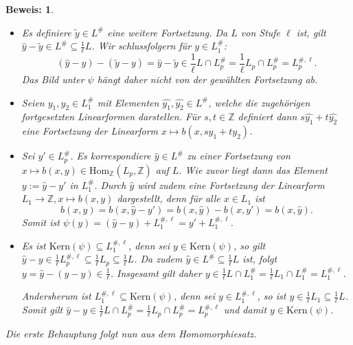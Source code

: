 \documentclass[12pt,a4paper,halfparskip,headsepline,bibtotocnumbered]{scrreprt}
\theoremstyle{nummermitklammern}
\theoremstyle{nonumberbreak}
\newtheorem{beweis}{Beweis:}
\newcommand{\Z}{\mathbb{Z}}
\newcommand{\Kern}{\text{Kern}}
\begin{document}
\begin{beweis}
	\begin{itemize}[align=left, leftmargin = *]
		\item[Wohldefiniert:] Es definiere $\tilde{y} \in L^\#$ eine weitere Fortsetzung. Da $L$ von Stufe $\ell$ ist, gilt $\hat{y} - \tilde{y} \in L^\# \subseteq \frac{1}{\ell} L$. Wir schlussfolgern für $y \in L_1^\#$:
			\begin{equation*}
				(\hat{y} - y) - (\tilde{y} - y) = \hat{y} - \tilde{y} \in \frac{1}{\ell} L \cap L_p^\# = \frac{1}{\ell} L_p \cap L_p^\# = L_p^{\#,\ell}.
			\end{equation*}
			Das Bild unter $\psi$ hängt daher nicht von der gewählten Fortsetzung ab.
		\item[Linearität:] Seien $y_1, y_2 \in L_1^\#$ mit Elementen $\hat{y_1}, \hat{y_2} \in L^\#$, welche die zugehörigen fortgesetzten Linearformen darstellen. Für $s,t \in \Z$ definiert dann $s \hat{y_1} + t \hat{y_2}$ eine Fortsetzung der Linearform $x \mapsto b(x, s y_1 + t y_2)$.
		\item[Surjektivität:] Sei $y' \in L_p^\#$. Es korrespondiere $\hat{y} \in L^\#$ zu einer Fortsetzung von\linebreak
		$x \mapsto b(x,y) \in \text{Hom}_\Z(L_p, \Z)$ auf $L$. Wie zuvor liegt dann das Element $y := \hat{y} - y'$ in $L_1^\#$. Durch $\hat{y}$ wird zudem eine Fortsetzung der Linearform $L_1 \rightarrow \Z, x \mapsto b(x,y)$ dargestellt, denn für alle $x \in L_1$ ist
			\begin{equation*}
				b(x,y) = b(x, \hat{y} - y') = b(x, \hat{y}) - b(x, y') = b(x, \hat{y}).
			\end{equation*}
			Somit ist $\psi(y) = (\hat{y} - y) + L_1^{\#, \ell} = y' + L_1^{\#, \ell}$.
		\item[Kern:] Es ist $\Kern(\psi) \subseteq L_1^{\#, \ell}$, denn sei $y \in \Kern(\psi)$, so gilt $\hat{y} - y \in \frac{1}{\ell}L_p^{\#, \ell} \subseteq \frac{1}{\ell} L_p \subseteq \frac{1}{\ell} L$. Da zudem $\hat{y} \in L^\# \subseteq \frac{1}{\ell} L$ ist, folgt $y = \hat{y} - (\hat{y} - y) \in \frac{1}{\ell}$. Insgesamt gilt daher\linebreak
			$y \in \frac{1}{\ell}L \cap L_1^\# = \frac{1}{\ell} L_1 \cap L_1^\# = L_1^{\#, \ell}$.\par
			Andersherum ist $L_1^{\#, \ell} \subseteq \Kern(\psi)$, denn sei $y \in L_1^{\#, \ell}$, so ist $y \in \frac{1}{\ell} L_1 \subseteq \frac{1}{\ell}L$. Somit gilt $\hat{y} - y \in \frac{1}{\ell} L \cap L_p^\# = \frac{1}{\ell} L_p \cap L_p^\# = L_p^{\#, \ell}$ und damit $y \in \Kern(\psi)$.
	\end{itemize}
	Die erste Behauptung folgt nun aus dem Homomorphiesatz.\par
	

\end{beweis}
\end{document}
